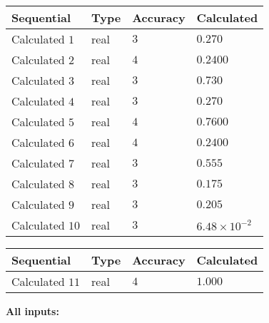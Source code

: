 \documentclass[12pt]{article}
\begin{document}
  
\noindent\begin{tabular}{|l|l|l|l|}
\hline
 Sequential & Type & Accuracy & Calculated \\ 
\hline
 
 
  Calculated $            1 $ & real & $            3  $ & 
 $ 0.270 $ 
 \\  \hline  
 
 
  Calculated $            2 $ & real & $            4  $ & 
 $ 0.2400 $ 
 \\  \hline  
 
 
  Calculated $            3 $ & real & $            3  $ & 
 $ 0.730 $ 
 \\  \hline  
 
 
  Calculated $            4 $ & real & $            3  $ & 
 $ 0.270 $ 
 \\  \hline  
 
 
  Calculated $            5 $ & real & $            4  $ & 
 $ 0.7600 $ 
 \\  \hline  
 
 
  Calculated $            6 $ & real & $            4  $ & 
 $ 0.2400 $ 
 \\  \hline  
 
 
  Calculated $            7 $ & real & $            3  $ & 
 $ 0.555 $ 
 \\  \hline  
 
 
  Calculated $            8 $ & real & $            3  $ & 
 $ 0.175 $ 
 \\  \hline  
 
 
  Calculated $            9 $ & real & $            3  $ & 
 $ 0.205 $ 
 \\  \hline  
 
 
  Calculated $           10 $ & real & $            3  $ & 
 $ 6.48 \times 10^{-2} $ 
 \\  \hline  
 \end{tabular}
   
   
  
  
\noindent\begin{tabular}{|l|l|l|l|}
\hline
 Sequential & Type & Accuracy & Calculated \\ 
\hline
 
 
  Calculated $           11 $ & real & $            4  $ & 
 $ 1.000 $ 
 \\  \hline  
 \end{tabular}
   
   
   
   
\noindent\vspace{0.1in}\hspace{-0.08in} {\textbf{\Large{All inputs: }}}
   
\end{document}
